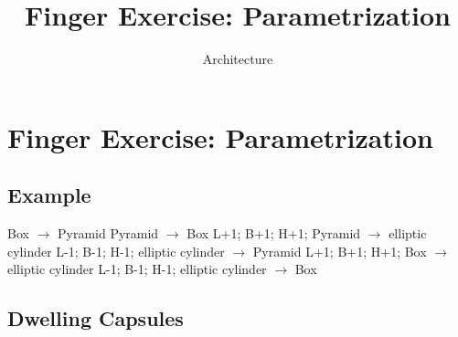 \title{Finger Exercise: Parametrization}
\author{Architecture}
\date{}

\section{Finger Exercise: Parametrization}
\subsection{Example}
\begin{AssignmentTable}{}
\end{AssignmentTable}
\begin{Diagram}[title={},break=false]
\AssignmentWorkedExampleGraph
\end{Diagram}
\begin{Transitions}[title={},break=false]
\AssignmentWorkedExampleLedger
  {Box $\to$ Pyramid}
  {Pyramid $\to$ Box}
  {L+1; B+1; H+1; Pyramid $\to$ elliptic cylinder}
  {L-1; B-1; H-1; elliptic cylinder $\to$ Pyramid}
  {L+1; B+1; H+1; Box $\to$ elliptic cylinder}
  {L-1; B-1; H-1; elliptic cylinder $\to$ Box}
\end{Transitions}
\clearpage
\subsection{Dwelling Capsules}
\begin{AssignmentTable}{}
\end{AssignmentTable}
\begin{AssignmentTable}{}
\end{AssignmentTable}
\clearpage
\begin{Diagram}[title={},break=false]
\AssignmentCompleteGraph
\end{Diagram}
\begin{Transitions}[title={},break=false]
\AssignmentSelectedLedger
\end{Transitions}

